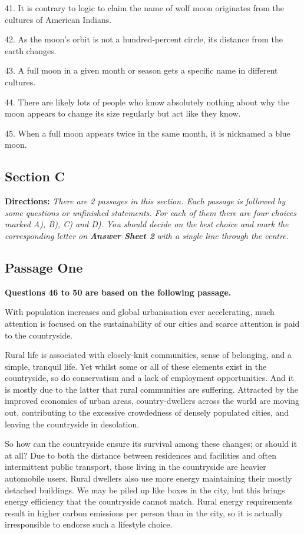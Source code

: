 \documentclass[UTF8,11pt]{ctexart}
\begin{document}
41. It is contrary to logic to claim the name of wolf moon originates from the cultures of American Indians.


42. As the moon’s orbit is not a hundred-percent circle, its distance from the earth changes.


43. A full moon in a given month or season gets a specific name in different cultures.


44. There are likely lots of people who know absolutely nothing about why the moon appears to change its size regularly but act like they know.


45. When a full moon appears twice in the same month, it is nicknamed a blue moon.


\subsection*{\textbf{Section C}}


\textbf{Directions: }\textit{There are 2 passages in this section. Each passage is followed by some questions or unfinished} \textit{statements. For each of them there are four choices marked A), B), C) and D). You should decide on the best} \textit{choice and mark the corresponding letter on }\textbf{\textit{Answer Sheet 2}}\textit{ with a single line through the centre.}


\subsection*{\textbf{Passage One}}


\textbf{Questions 46 to 50 are based on the following passage.}


With population increases and global urbanisation ever accelerating, much attention is focused on the sustainability of our cities and scarce attention is paid to the countryside.


Rural life is associated with closely-knit communities, sense of belonging, and a simple, tranquil life. Yet whilst some or all of these elements exist in the countryside, so do conservatism and a lack of employment opportunities. And it is mostly due to the latter that rural communities are suffering. Attracted by the improved economics of urban areas, country-dwellers across the world are moving out, contributing to the excessive crowdedness of densely populated cities, and leaving the countryside in desolation.


So how can the countryside ensure its survival among these changes; or should it at all? Due to both the distance between residences and facilities and often intermittent public transport, those living in the countryside are heavier automobile users. Rural dwellers also use more energy maintaining their mostly detached buildings. We may be piled up like boxes in the city, but this brings energy efficiency that the countryside cannot match. Rural energy requirements result in higher carbon emissions per person than in the city, so it is actually irresponsible to endorse such a lifestyle choice.
\end{document}
